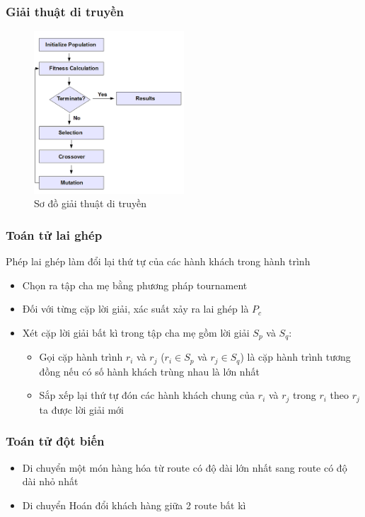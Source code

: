 \documentclass{beamer}
\begin{document}
	\begin{frame}
		\frametitle{Giải thuật di truyền}
		\begin{figure}
			\centering
			\caption{Sơ đồ giải thuật di truyền}
			\includegraphics[width=0.5\textwidth]{images/ga-flow.png}
		\end{figure}
	\end{frame}

	\begin{frame}
		\frametitle{Toán tử lai ghép}
		Phép lai ghép làm đổi lại thứ tự của các hành khách trong hành trình
		\begin{itemize}
			\item Chọn ra tập cha mẹ bằng phương pháp tournament
			\item Đối với từng cặp lời giải, xác suất xảy ra lai ghép là $P_c$
			\item Xét cặp lời giải bất kì trong tập cha mẹ gồm lời giải $S_p$ và $S_q$:
				\begin{itemize}
					\item Gọi cặp hành trình $r_i$ và $r_j$ ($r_i \in S_p$ và $r_j \in S_q$) là cặp hành trình tương đồng nếu có số hành khách trùng nhau là lớn nhất
					\item Sắp xếp lại thứ tự đón các hành khách chung của $r_i$ và $r_j$ trong $r_i$ theo $r_j$ ta được lời giải mới
				\end{itemize}
		\end{itemize}
	\end{frame}

	\begin{frame}
		\frametitle{Toán tử đột biến}
		\begin{itemize}
			\item Di chuyển một món hàng hóa từ route có độ dài lớn nhất sang route có độ dài nhỏ nhất
			\item Di chuyển Hoán đổi khách hàng giữa 2 route bất kì
		\end{itemize}
	\end{frame}
	
\end{document}
